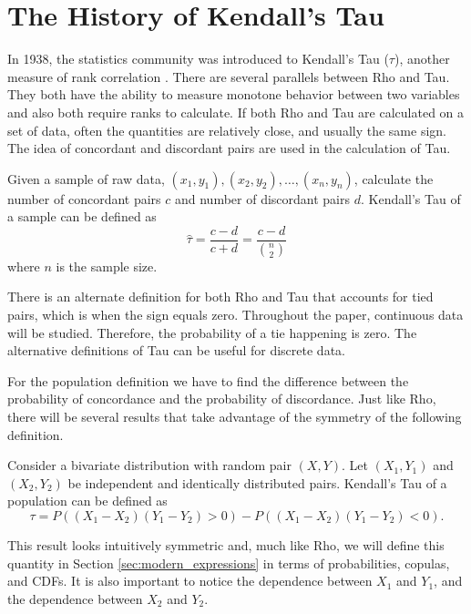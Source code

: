 \section{The History of Kendall's Tau}\label{sec:the_history_of_kendalls_tau}
\hspace{24pt} In 1938, the statistics community was introduced to Kendall's Tau ($\tau$), another measure of rank correlation \cite{kendall1938}. There are several parallels between Rho and Tau. They both have the ability to measure monotone behavior between two variables and also both require ranks to calculate. If both Rho and Tau are calculated on a set of data, often the quantities are relatively close, and usually the same sign. The idea of concordant and discordant pairs are used in the calculation of Tau.
\begin{definition}\label{def:kendalls_sample}
    Given a sample of raw data, $\left(x_1,y_1\right),\left(x_2,y_2\right),\ldots,\left(x_n,y_n\right)$, calculate the number of concordant pairs $c$ and number of discordant pairs $d$. Kendall's Tau of a sample can be defined as $$\widehat{\tau}=\frac{c-d}{c+d}=\frac{c-d}{{n \choose 2}}$$ where $n$ is the sample size.
\end{definition}
There is an alternate definition for both Rho and Tau that accounts for tied pairs, which is when the sign equals zero. Throughout the paper, continuous data will be studied. Therefore, the probability of a tie happening is zero. The alternative definitions of Tau can be useful for discrete data.

For the population definition we have to find the difference between the probability of concordance and the probability of discordance. Just like Rho, there will be several results that take advantage of the symmetry of the following definition.
\begin{definition}\label{def:kendalls_population}
    Consider a bivariate distribution with random pair $(X, Y)$. Let $(X_1,Y_1)$ and $(X_2,Y_2)$ be independent and identically distributed pairs. Kendall's Tau of a population can be defined as $$\tau=P\left(\left(X_1-X_2\right)\left(Y_1-Y_2\right)>0\right)-P\left(\left(X_1-X_2\right)\left(Y_1-Y_2\right)<0\right).$$
\end{definition}
This result looks intuitively symmetric and, much like Rho, we will define this quantity in Section \ref{sec:modern_expressions} in terms of probabilities, copulas, and CDFs. It is also important to notice the dependence between $X_1$ and $Y_1$, and the dependence between $X_2$ and $Y_2$.

